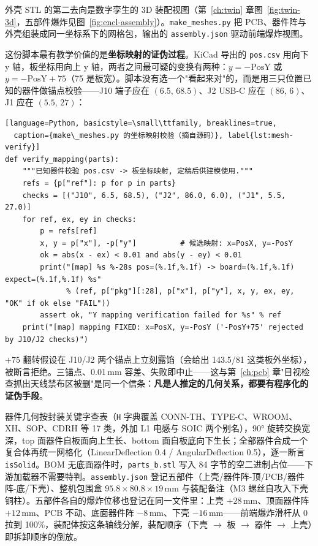 外壳 STL 的第二去向是数字孪生的 3D 装配视图（第~\ref{ch:twin} 章图~\ref{fig:twin-3d}，五部件爆炸见图~\ref{fig:encl-assembly}）。\texttt{make\_meshes.py} 把 PCB、器件阵与外壳组装成同一坐标系下的网格包，输出的 \texttt{assembly.json} 驱动前端爆炸视图。

这份脚本最有教学价值的是\textbf{坐标映射的证伪过程}。KiCad 导出的 \texttt{pos.csv} 用向下 y 轴，板坐标用向上 y 轴，两者之间最可疑的变换有两种：$y=-\text{PosY}$ 或 $y=-\text{PosY}+75$（75 是板宽）。脚本没有选一个"看起来对"的，而是用三只位置已知的器件做锚点校验——J10 端子应在 $(6.5,\,68.5)$、J2 USB-C 应在 $(86,\,6)$、J1 应在 $(5.5,\,27)$：

\begin{lstlisting}[language=Python, basicstyle=\small\ttfamily, breaklines=true,
  caption={make\_meshes.py 的坐标映射校验（摘自源码）}, label{lst:mesh-verify}]
def verify_mapping(parts):
    """已知器件校验 pos.csv -> 板坐标映射, 定稿后供建模使用."""
    refs = {p["ref"]: p for p in parts}
    checks = [("J10", 6.5, 68.5), ("J2", 86.0, 6.0), ("J1", 5.5, 27.0)]
    for ref, ex, ey in checks:
        p = refs[ref]
        x, y = p["x"], -p["y"]          # 候选映射: x=PosX, y=-PosY
        ok = abs(x - ex) < 0.01 and abs(y - ey) < 0.01
        print("[map] %s %-28s pos=(%.1f,%.1f) -> board=(%.1f,%.1f) expect=(%.1f,%.1f) %s"
              % (ref, p["pkg"][:28], p["x"], p["y"], x, y, ex, ey, "OK" if ok else "FAIL"))
        assert ok, "Y mapping verification failed for %s" % ref
    print("[map] mapping FIXED: x=PosX, y=-PosY ('-PosY+75' rejected by J10/J2 checks)")
\end{lstlisting}

$+75$ 翻转假设在 J10/J2 两个锚点上立刻露馅（会给出 143.5/81 这类板外坐标），被断言拒绝。三锚点、0.01\,mm 容差、失败即中止——这与第~\ref{ch:pcb} 章"目视检查抓出天线禁布区被删"是同一个信条：\textbf{凡是人推定的几何关系，都要有程序化的证伪手段}。

器件几何按封装关键字查表（\texttt{H} 字典覆盖 CONN-TH、TYPE-C、WROOM、XH、SOP、CDRH 等 17 类，外加 L1 电感与 SOIC 两个别名），90° 旋转交换宽深，top 面器件自板面向上生长、bottom 面自板底向下生长；全部器件合成一个复合体再统一网格化（LinearDeflection 0.4 / AngularDeflection 0.5），逐一断言 \texttt{isSolid}。BOM 无底面器件时，\texttt{parts\_b.stl} 写入 84 字节的空二进制占位——下游加载器不需要特判。\texttt{assembly.json} 登记五部件（上壳/器件阵-顶/PCB/器件阵-底/下壳）、整机包围盒 $95.8\times80.8\times19$\,mm 与装配备注（M3 螺丝自攻入下壳铜柱）。五部件各自的爆炸位移也登记在同一文件里：上壳 $+28$\,mm、顶面器件阵 $+12$\,mm、PCB 不动、底面器件阵 $-8$\,mm、下壳 $-16$\,mm——前端爆炸滑杆从 0 拉到 100\%，装配体按这条轴线分解，装配顺序（下壳 $\to$ 板 $\to$ 器件 $\to$ 上壳）即拆卸顺序的倒放。

